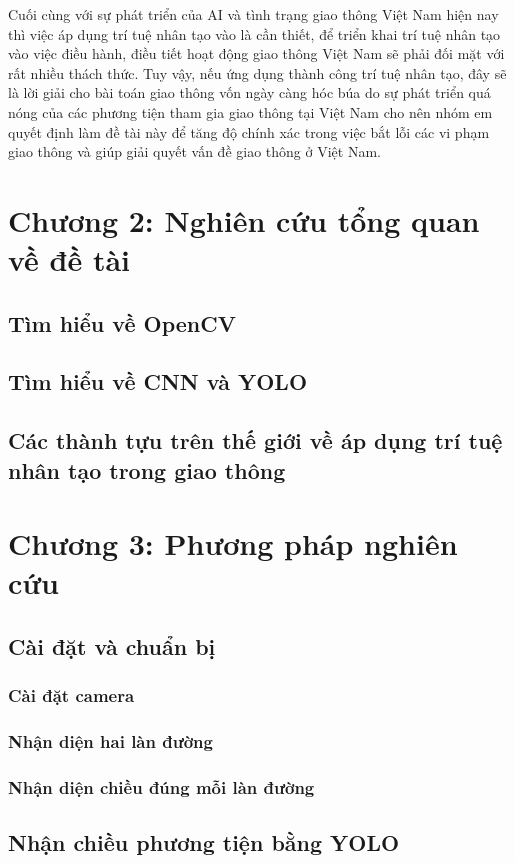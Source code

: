 \documentclass[14pt,oneside,a4paper]{extreport}
\begin{document}
Cuối cùng với sự phát triển của AI và tình trạng giao thông Việt Nam hiện nay thì việc áp dụng trí tuệ nhân tạo vào là cần thiết, để triển khai trí tuệ nhân tạo vào việc điều hành, điều tiết hoạt động giao thông Việt Nam sẽ phải đối mặt với rất nhiều thách thức. Tuy vậy, nếu ứng dụng thành công trí tuệ nhân tạo, đây sẽ là lời giải cho bài toán giao thông vốn ngày càng hóc búa do sự phát triển quá nóng của các phương tiện tham gia giao thông tại Việt Nam cho nên nhóm em quyết định làm đề tài này để tăng độ chính xác trong việc bắt lỗi các vi phạm giao thông và giúp giải quyết vấn đề giao thông ở Việt Nam.

\section{Chương 2: Nghiên cứu tổng quan về đề tài}
\subsection{Tìm hiểu về OpenCV}
\subsection{Tìm hiểu về CNN và YOLO}
\subsection{Các thành tựu trên thế giới về áp dụng trí tuệ nhân tạo trong giao thông}
\section{Chương 3: Phương pháp nghiên cứu}
\subsection{Cài đặt và chuẩn bị}
\subsubsection{Cài đặt camera}
\subsubsection{Nhận diện hai làn đường}
\subsubsection{Nhận diện chiều đúng mỗi làn đường}
\subsection{Nhận chiều phương tiện bằng YOLO}
\end{document}
